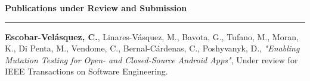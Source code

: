 \documentclass[letterpaper,11pt,oneside]{article}
\begin{document}
\noindent \Large{\textbf{Publications under Review and Submission}} \\
\vspace{-2ex}
\hrule 
\normalsize
\vspace{2ex}
\noindent \textbf{Escobar-Velásquez, C.}, Linares-Vásquez, M., Bavota, G., Tufano, M., Moran, K., Di Penta, M., Vendome, C., Bernal-Cárdenas, C., Poshyvanyk, D., \textit{"Enabling Mutation Testing for Open- and Closed-Source Android Apps"}, Under review for IEEE Transactions on Software Engineering.
\\
\end{document}
